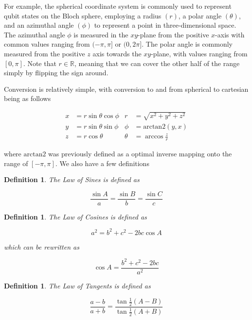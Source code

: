 \documentclass[12pt]{article}
\theoremstyle{plain}
\newtheorem{definition}[theorem]{Definition}
\theoremstyle{definition}
\begin{document}
For example, the spherical coordinate system is commonly used to represent qubit states on the Bloch sphere, employing a radius $(r)$, a polar angle $(\theta)$, and an azimuthal angle $(\phi)$ to represent a point in three-dimensional space. The azimuthal angle $\phi$ is measured in the $xy$-plane from the positive $x$-axis with common values ranging from $(-\pi, \pi]$ or $(0, 2\pi]$. The polar angle is commonly measured from the positive $z$ axis towards the $xy$-plane, with values ranging from $[0, \pi]$. Note that $r \in \mathbb{R}$, meaning that we can cover the other half of the range simply by flipping the sign around. 

Conversion is relatively simple, with conversion to and from spherical to cartesian being as follows

\begin{align*}
    x &= r \sin \theta \cos \phi &     r &= \sqrt{x^2 + y^2 + z^2} \\
    y &= r \sin \theta \sin \phi &     \phi &= \mathrm{arctan2} (y, x) \\
    z &= r \cos \theta &         \theta &= \arccos \frac{z}{r}
\end{align*}

where $\mathrm{arctan2}$ was previously defined as a optimal inverse mapping onto the range of $[- \pi, \pi]$. We also have a few definitions

\begin{definition}
    The Law of Sines is defined as 

    $$\frac{\sin A}{a} = \frac{\sin B}{b} = \frac{\sin C}{c}$$
\end{definition}

\begin{definition}
    The Law of Cosines is defined as 

    $$a^2 = b^2 + c^2 - 2bc \cos A$$

    which can be rewritten as 

    $$\cos A = \frac{b^2 + c^2 - 2bc}{a^2}$$
\end{definition}

\begin{definition}
    The Law of Tangents is defined as 

    $$\frac{a - b}{a + b} = \frac{\tan \tfrac{1}{2}(A - B)}{\tan \tfrac{1}{2}(A + B)}$$
\end{definition}
\end{document}
